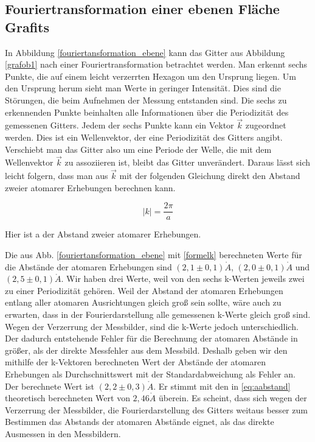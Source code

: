 \documentclass[10pt,a4paper]{article}
\begin{document}
\subsection{Fouriertransformation einer ebenen Fläche Grafits}

In Abbildung \ref{fouriertansformation_ebene} kann das Gitter aus Abbildung \ref{grafob1} nach einer Fouriertransformation betrachtet werden. Man erkennt sechs Punkte, die auf einem leicht verzerrten Hexagon um den Ursprung liegen. Um den Ursprung herum sieht man Werte in geringer Intensität. Dies sind die Störungen, die beim Aufnehmen der Messung entstanden sind. Die sechs zu erkennenden Punkte beinhalten alle Informationen über die Periodizität des gemessenen Gitters. Jedem der sechs Punkte kann ein Vektor $\vec{k}$ zugeordnet werden. Dies ist ein Wellenvektor, der eine Periodizität des Gitters angibt. Verschiebt man das Gitter also um eine Periode der Welle, die mit dem Wellenvektor $\vec{k}$ zu assoziieren ist, bleibt das Gitter unverändert. Daraus lässt sich leicht folgern, dass man aus $\vec{k}$ mit der folgenden Gleichung direkt den Abstand zweier atomarer Erhebungen berechnen kann.

\begin{equation}
	|k| = \frac{2\pi}{a}
	\label{formelk}
\end{equation}

Hier ist a der Abstand zweier atomarer Erhebungen.

Die aus Abb. \ref{fouriertansformation_ebene} mit \eqref{formelk} berechneten Werte für die Abstände der atomaren Erhebungen sind $(2,1\pm0,1)\mathring{A}$, $(2,0\pm0,1)\mathring{A}$ und $(2,5\pm0,1)\mathring{A}$. Wir haben drei Werte, weil von den sechs k-Werten jeweils zwei zu einer Periodizität gehören. Weil der Abstand der atomaren Erhebungen entlang aller atomaren Ausrichtungen gleich groß sein sollte, wäre auch zu erwarten, dass in der Fourierdarstellung alle gemessenen k-Werte gleich groß sind. Wegen der Verzerrung der Messbilder, sind die k-Werte jedoch unterschiedlich. Der dadurch entstehende Fehler für die Berechnung der atomaren Abstände in größer, als der direkte Messfehler aus dem Messbild. Deshalb geben wir den mithilfe der k-Vektoren berechneten Wert der Abstände der atomaren Erhebungen als Durchschnittswert mit der Standardabweichung als Fehler an. Der berechnete Wert ist $(2,2 \pm 0,3)\mathring{A}$. Er stimmt mit den in \eqref{eq:aabstand} theoretisch berechneten Wert von $2,46\mathring{A}$ überein. Es scheint, dass sich wegen der Verzerrung der Messbilder, die Fourierdarstellung des Gitters weitaus besser zum Bestimmen das Abstands der atomaren Abstände eignet, als das direkte Ausmessen in den Messbildern.
\end{document}
